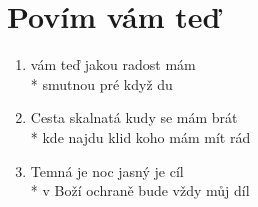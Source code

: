 \section{Povím vám teď}
\begin{enumerate}
\item {} vám teď jakou radost mám \\*
smutnou pré  když du   
\item Cesta skalnatá kudy se mám brát \\*
kde najdu klid koho mám mít rád 
\item Temná je noc jasný je cíl \\*
v Boží ochraně bude vždy můj díl 
\end{enumerate}
